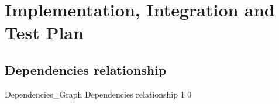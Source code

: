 \documentclass[../DD0.tex]{subfiles}
\begin{document}
\section{Implementation, Integration and Test Plan}
\label{sec:imp}
\subsection{Dependencies relationship}

\fetchUML
      {Dependencies_Graph}
      {Dependencies relationship}
      {1}           %
      {0}
\end{document}
